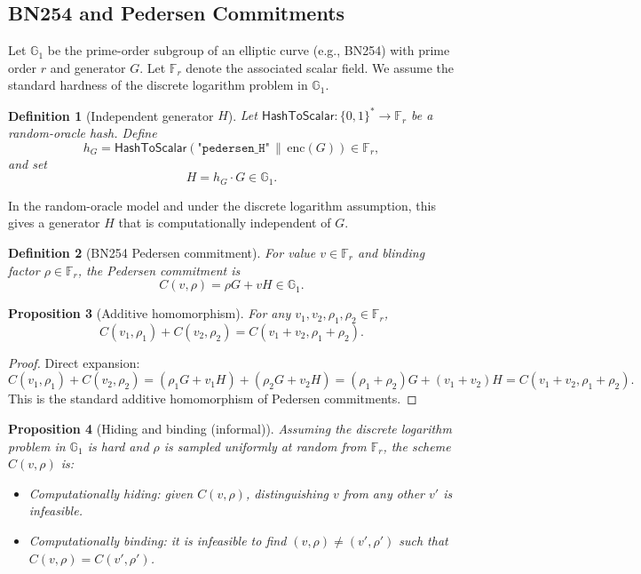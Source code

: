 \documentclass[11pt]{article}
\newtheorem{definition}{Definition}[section]
\newtheorem{proposition}[definition]{Proposition}
\newcommand{\F}{\mathbb{F}}
\newcommand{\G}{\mathbb{G}}
\begin{document}
\subsection{BN254 and Pedersen Commitments}

Let \(\G_1\) be the prime-order subgroup of an elliptic curve (e.g., BN254) with prime order \(r\) and generator \(G\).
Let \(\F_r\) denote the associated scalar field.
We assume the standard hardness of the discrete logarithm problem in \(\G_1\).

\begin{definition}[Independent generator \(H\)]
Let \(\mathsf{HashToScalar} : \{0,1\}^* \to \F_r\) be a random-oracle hash.
Define
\[
  h_G = \mathsf{HashToScalar}(\texttt{"pedersen\_H"} \,\|\, \mathrm{enc}(G)) \in \F_r,
\]
and set
\[
  H = h_G \cdot G \in \G_1.
\]
\end{definition}

In the random-oracle model and under the discrete logarithm assumption, this gives a generator \(H\) that is computationally independent of \(G\).\cite{PedersenZKDocs,PedersenRareSkills,CommitmentSchemeWiki}

\begin{definition}[BN254 Pedersen commitment]
For value \(v \in \F_r\) and blinding factor \(\rho \in \F_r\), the Pedersen commitment is
\[
  C(v,\rho) = \rho G + v H \in \G_1.
\]
\end{definition}

\begin{proposition}[Additive homomorphism]
For any \(v_1,v_2,\rho_1,\rho_2 \in \F_r\),
\[
  C(v_1,\rho_1) + C(v_2,\rho_2) = C(v_1+v_2,\rho_1+\rho_2).
\]
\end{proposition}

\begin{proof}
Direct expansion:
\[
  C(v_1,\rho_1) + C(v_2,\rho_2) = (\rho_1 G + v_1 H) + (\rho_2 G + v_2 H)
  = (\rho_1+\rho_2)G + (v_1+v_2)H = C(v_1+v_2,\rho_1+\rho_2).
\]
This is the standard additive homomorphism of Pedersen commitments.\cite{PedersenZKDocs,PedersenRareSkills}
\end{proof}

\begin{proposition}[Hiding and binding (informal)]
Assuming the discrete logarithm problem in \(\G_1\) is hard and \(\rho\) is sampled uniformly at random from \(\F_r\), the scheme \(C(v,\rho)\) is:
\begin{itemize}
  \item Computationally \emph{hiding}: given \(C(v,\rho)\), distinguishing \(v\) from any other \(v'\) is infeasible.
  \item Computationally \emph{binding}: it is infeasible to find \((v,\rho) \ne (v',\rho')\) such that \(C(v,\rho) = C(v',\rho')\).
\end{itemize}
\end{proposition}
\end{document}

